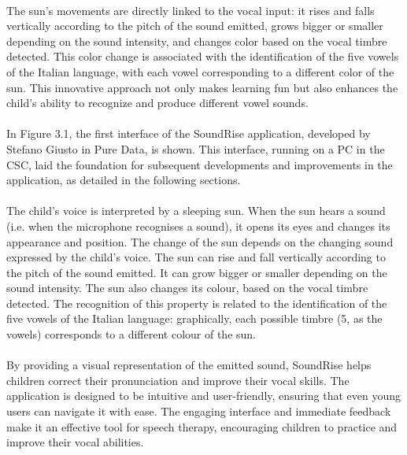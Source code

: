 \paragraph{}
The sun's movements are directly linked to the vocal input: it rises and falls vertically according to the pitch of the sound emitted, grows bigger or smaller depending on the sound intensity, and changes color based on the vocal timbre detected. This color change is associated with the identification of the five vowels of the Italian language, with each vowel corresponding to a different color of the sun. This innovative approach not only makes learning fun but also enhances the child's ability to recognize and produce different vowel sounds.



\paragraph{}
In Figure 3.1, the first interface of the SoundRise application, developed by Stefano Giusto \cite{giusto2012} in Pure Data, is shown. This interface, running on a PC in the CSC, laid the foundation for subsequent developments and improvements in the application, as detailed in the following sections.


\paragraph{}
The child's voice is interpreted by a sleeping sun. When the sun hears a sound (i.e. when the microphone recognises a sound), it opens its eyes and changes its appearance and position. The change of the sun depends on the changing sound expressed by the child's voice. The sun can rise and fall vertically according to the pitch of the sound emitted. It can grow bigger or smaller depending on the sound intensity. The sun also changes its colour, based on the vocal timbre detected. The recognition of this property is related to the identification of the five vowels of the Italian language: graphically, each possible timbre (5, as the vowels) corresponds to a different colour of the sun.

\paragraph{}
By providing a visual representation of the emitted sound, SoundRise helps children correct their pronunciation and improve their vocal skills. The application is designed to be intuitive and user-friendly, ensuring that even young users can navigate it with ease. The engaging interface and immediate feedback make it an effective tool for speech therapy, encouraging children to practice and improve their vocal abilities.

